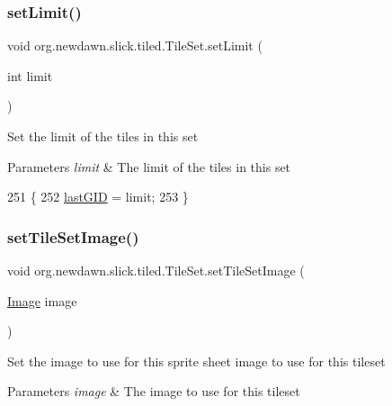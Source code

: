 \subsubsection{\texorpdfstring{set\+Limit()}{setLimit()}}
{\footnotesize\ttfamily void org.\+newdawn.\+slick.\+tiled.\+Tile\+Set.\+set\+Limit (\begin{DoxyParamCaption}\item[{int}]{limit }\end{DoxyParamCaption})\hspace{0.3cm}{\ttfamily [inline]}}

Set the limit of the tiles in this set


\begin{DoxyParams}{Parameters}
{\em limit} & The limit of the tiles in this set \\
\hline
\end{DoxyParams}

\begin{DoxyCode}
251                                     \{
252         \mbox{\hyperlink{classorg_1_1newdawn_1_1slick_1_1tiled_1_1_tile_set_a828b4b9fe91730b4e4e24b6f3f443b1b}{lastGID}} = limit;
253     \}
\end{DoxyCode}
\mbox{\label{classorg_1_1newdawn_1_1slick_1_1tiled_1_1_tile_set_a06c06564f6695455d57a2260b7d1df09}} 
\subsubsection{\texorpdfstring{set\+Tile\+Set\+Image()}{setTileSetImage()}}
{\footnotesize\ttfamily void org.\+newdawn.\+slick.\+tiled.\+Tile\+Set.\+set\+Tile\+Set\+Image (\begin{DoxyParamCaption}\item[{\mbox{\hyperlink{classorg_1_1newdawn_1_1slick_1_1_image}{Image}}}]{image }\end{DoxyParamCaption})\hspace{0.3cm}{\ttfamily [inline]}}

Set the image to use for this sprite sheet image to use for this tileset


\begin{DoxyParams}{Parameters}
{\em image} & The image to use for this tileset \\
\hline
\end{DoxyParams}

